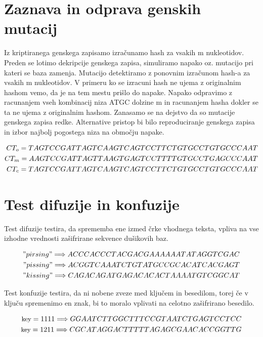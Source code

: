 \documentclass[graybox, envcountchap]{svmult}
\begin{document}
\newpage

\section{Zaznava in odprava genskih mutacij}
\label{g01:subsec:2}
Iz kriptiranega genskega zapisamo izračunamo hash za vsakih m nukleotidov. Preden se lotimo dekripcije genskega zapisa, simuliramo napako oz. mutacijo pri kateri se baza zamenja. Mutacijo detektiramo z ponovnim izračunom hash-a za vsakih m nukleotidov. V primeru ko se izracuni hash ne ujema z originalnim hashom vemo, da je na tem mestu prišlo do napake. Napako odpravimo z racunanjem vseh kombinacij niza  ATGC  dolzine m in racunanjem hasha dokler se ta ne ujema z originalnim hashom. Zanasamo se na dejstvo da so mutacije genskega zapisa redke. Alternative pristop bi bilo reproduciranje genskega zapisa in izbor najbolj pogostega niza na območju napake.


\begin{equation}
\begin{split}
\small 
CT_o = TAGTCCGATTAGTCAAGTCAGTCCTTCTGTGCCTGTGCCCAAT \\
CT_m = AAGTCCGATTAGTTAAGTGAGTCCTTTTGTGCCTGAGCCCAAT \\
CT_c = TAGTCCGATTAGTCAAGTCAGTCCTTCTGTGCCTGTGCCCAAT
\end{split}
\end{equation}

\section{Test difuzije in konfuzije}
Test difuzije testira, da sprememba ene izmed črke vhodnega teksta, vpliva na vse izhodne vrednosti zašifrirane sekvence dušikovih baz.

\begin{equation}
\begin{split}
    "pirsing" \Longrightarrow ACCCACCCTACGACGAAAAAATATAGGTCGAC \\
    "pissing" \Longrightarrow ACGGTCAAATCTGTATGCCGCACATCACGAGT \\
    "kissing" \Longrightarrow CAGACAGATGAGACACACTAAAATGTCGGCAT
\end{split}
\end{equation}

Test konfuzije testira, da ni nobene zveze med ključem in besedilom, torej če v ključu spremenimo en znak, bi to moralo vplivati na celotno zašifrirano besedilo.

\begin{equation}
\begin{split}
\small 
\text{key} = 1111 \Longrightarrow GGAATCTTGGCTTTCCGTAATCTGAGTCCTCC \\
\small
\text{key} = 1211 \Longrightarrow CGCATAGGACTTTTTAGAGCGAACACCGGTTG 
\end{split}
\end{equation}
\end{document}
